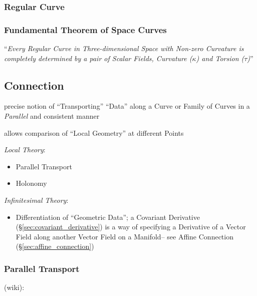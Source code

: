 \subsubsection{Regular Curve}\label{sec:regular_curve}

\subsubsection{Fundamental Theorem of Space Curves}
\label{sec:fundamental_curve_theorem}

``\emph{Every Regular Curve in Three-dimensional Space with Non-zero
Curvature is completely determined by a pair of Scalar Fields, Curvature
($\kappa$) and Torsion ($\tau$)}''



\subsection{Connection}\label{sec:connection}

precise notion of ``Transporting'' ``Data'' along a Curve or Family of Curves
in a \emph{Parallel} and consistent manner

allows comparison of ``Local Geometry'' at different Points

\emph{Local Theory}:
\begin{itemize}
  \item Parallel Transport
  \item Holonomy
\end{itemize}

\emph{Infinitesimal Theory}:
\begin{itemize}
  \item Differentiation of ``Geometric Data''; a Covariant Derivative
    (\S\ref{sec:covariant_derivative}) is a way of specifying a Derivative of a
    Vector Field along another Vector Field on a Manifold-- see Affine
    Connection (\S\ref{sec:affine_connection})
\end{itemize}



\subsubsection{Parallel Transport}\label{sec:parallel_transport}

(wiki):

